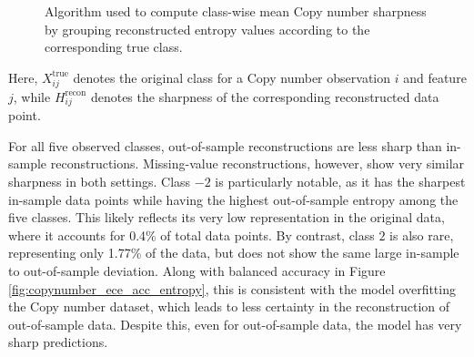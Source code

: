 \begin{figure}[!ht]
\centering
{}
\caption[Class-wise Copy number sharpness calculation algorithm]{Algorithm used to compute class-wise mean Copy number sharpness by grouping reconstructed entropy values according to the corresponding true class.}
\label{fig:copy_number_classwise_sharpness_algorithm}
\end{figure}

Here, $X_{ij}^{\mathrm{true}}$ denotes the original class for a Copy number observation $i$ and feature $j$, while $H_{ij}^{\mathrm{recon}}$ denotes the sharpness of the corresponding reconstructed data point.

For all five observed classes, out-of-sample reconstructions are less sharp than in-sample reconstructions. Missing-value reconstructions, however, show very similar sharpness in both settings. Class $-2$ is particularly notable, as it has the sharpest in-sample data points while having the highest out-of-sample entropy among the five classes. This likely reflects its very low representation in the original data, where it accounts for 0.4\% of total data points. By contrast, class $2$ is also rare, representing only 1.77\% of the data, but does not show the same large in-sample to out-of-sample deviation. Along with balanced accuracy in Figure \ref{fig:copynumber_ece_acc_entropy}, this is consistent with the model overfitting the Copy number dataset, which leads to less certainty in the reconstruction of out-of-sample data. Despite this, even for out-of-sample data, the model has very sharp predictions.

